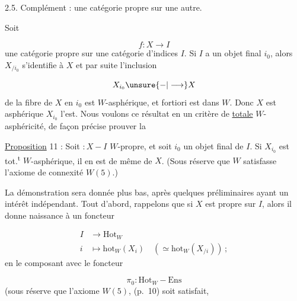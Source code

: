 2.5. Complément :   une catégorie propre sur une autre.

Soit

\[
f:X\longrightarrow I
\]
une catégorie propre sur une catégorie d'indices $I$. Si $I$ a un objet final $i_0$, alors  $X_{/i_0}$ s'identifie à $X$ et par suite l'inclusion 

\[
X_{i_0}\unsure{-|\longrightarrow}X
\]
de la fibre de $X$ en $i_0$ est $W$-asphérique, et  fortiori est dans $W$. Donc $X$ est asphérique  $X_{i_0}$ l'est. Nous voulons  ce résultat en un critère de \uline{totale} $W$-asphéricité, de façon précise prouver la

\uline{Proposition} 11 : Soit $:X-I$ $W$-propre, et \margin{$\searrow\!\searrow$}soit $i_0$ un objet final de $I$. Si $X_{i_0}$ est tot.\textsuperscript{t} $W$-asphérique,  il en est de même de $X$. (Sous réserve que $W$ satisfasse l'axiome de connexité $W(5)$.)

La démonstration sera donnée plus bas, après quelques préliminaires ayant un intérêt indépendant. Tout d'abord, rappelons que si $X$ est propre sur $I$, alors il donne naissance à un foncteur

\[
\begin{aligned}
I&\longrightarrow\mathrm{Hot}_W\\
i&\longmapsto\mathrm{hot}_W(X_i)\quad(\simeq\mathrm{hot}_W(X_{/i}))\,;
\end{aligned}
\]
en le composant avec le foncteur

\[
\pi_0:\mathrm{Hot}_W-\mathrm{Ens}
\]
(sous réserve que l'axiome  $W(5)$,  (p.~10) soit satisfait,
